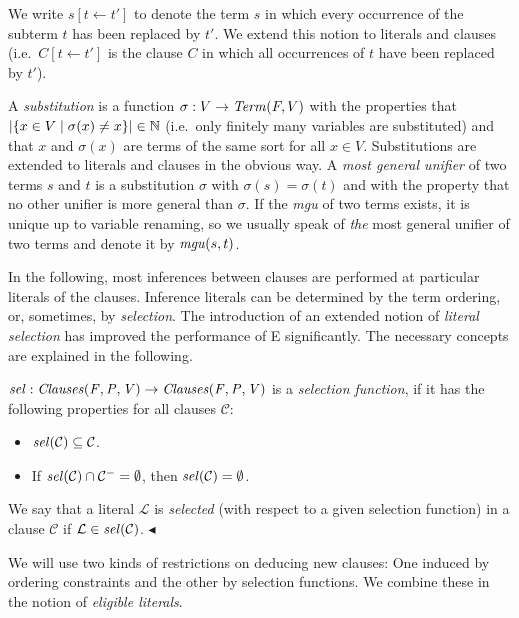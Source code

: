 \documentclass{report}
\begin{document}
We write $s[t\leftarrow t']$ to denote the term $s$ in which every
occurrence of the subterm $t$ has been replaced by $t'$. We extend this
notion to literals and clauses (i.e.\ $C[t\leftarrow t']$ is the
clause $C$ in which all occurrences of $t$ have been replaced by
$t'$).

A \emph{substitution} is a function
$\sigma: V\to \mathit{Term}(F,V)$ with the properties that
$|\{ x\in V \mid \sigma(x)\not=x\}| \in \mathbb N$ (i.e.\ only finitely
many variables are substituted) and that $x$ and $\sigma(x)$ are terms
of the same sort for all $x \in V$. Substitutions are extended to
literals and clauses in the obvious way. A \emph{most general
  unifier} of two terms $s$ and
$t$ is a substitution $\sigma$ with $\sigma(s)=\sigma(t)$ and with the
property that no other unifier is more general than $\sigma$. If the
\emph{mgu} of two terms exists, it is unique up to variable renaming,
so we usually speak of \emph{the} most general unifier of two terms
and denote it by $\mathit{mgu}(s,t)$.

In the following, most inferences between clauses are performed at
particular literals of the clauses. Inference literals can be
determined by the term ordering, or, sometimes, by \emph{selection}.  The
introduction of an extended notion of \emph{literal selection} has
improved the performance of E significantly. The necessary concepts
are explained in the following.

\begin{definition}
  \label{def:basics:inferences:selection}
  $\mathit{sel}:\mathit{Clauses(F,P,V)} \rightarrow \mathit{Clauses(F,P,V)}$ is a
  \emph{selection function}, if it has the following properties for
  all clauses $\mathcal{C}$:
    \begin{itemize}
    \item $\mathit{sel}(\mathcal{C}) \subseteq \mathcal{C}$.
    \item If $\mathit{sel}(\mathcal{C})\cap \mathcal{C^-} = \emptyset$, then
      $\mathit{sel}(\mathcal{C}) = \emptyset$.
    \end{itemize}
    We say that a literal $\mathcal{L}$ is \emph{selected} (with
    respect to a given selection function) in a clause $\mathcal{C}$
    if $\mathcal{L} \in \mathit{sel}(\mathcal{C})$.
  \hfill$\blacktriangleleft$
\end{definition}

We will use two kinds of restrictions on deducing new clauses: One
induced by ordering constraints and the other by selection functions.
We combine these in the notion of \emph{eligible literals}.
\end{document}
